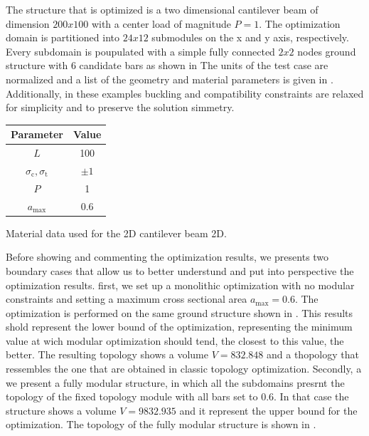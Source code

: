 The structure that is optimized is a two dimensional cantilever beam of dimension $200x100$ with a center load of magnitude $P=1$. The optimization domain is partitioned into $24x12$ submodules on the x and y axis, respectively. Every subdomain is poupulated with a simple fully connected $2x2$ nodes ground structure with 6 candidate bars as shown in  The units of the test case are normalized and a list of the geometry and material parameters is given in . Additionally, in these examples buckling and compatibility constraints are relaxed for simplicity and to preserve the solution simmetry.

\begin{margintable}
    \small
    \centering
    \begin{tabular}{cc}
    \toprule
    \textbf{Parameter}        & \textbf{Value} \\ \midrule
    $L$              & 100     \\
    $\sigma_\text{c}, \sigma_\text{t}$ & $\pm 1$\\
    $P$              & 1   \\
    $a_\text{max}$              & 0.6   \\
    \bottomrule
    \end{tabular}
    \caption{Material data used for the 2D cantilever beam 2D.}
    \label{tab:06_modular_cant_data}
\end{margintable}

Before showing and commenting the optimization results, we presents two boundary cases that allow us to better understund and put into perspective the optimization results. first, we set up a monolithic optimization with no modular constraints and setting a maximum cross sectional area $a_\text{max}=0.6$. The optimization is performed on the same ground structure shown in . This results shold represent the lower bound of the optimization, representing the minimum value at wich modular optimization should tend, the closest to this value, the better. The resulting topology shows a volume $V=832.848$ and a thopology that ressembles the one that are obtained in classic topology optimization. Secondly, a we present a fully modular structure, in which all the subdomains presrnt the topology of the fixed topology module with all bars set to 0.6. In that case the structure shows a volume $V=9832.935$ and it represent the upper bound for the optimization. The topology of the fully modular structure is shown in .

